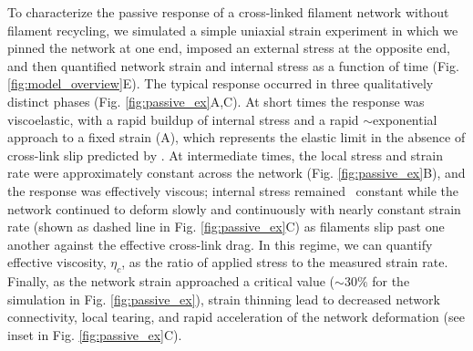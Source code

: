 To characterize the passive response of a cross-linked filament network without filament recycling, we simulated a simple uniaxial strain experiment in which we pinned the network at one end, imposed an external stress at the opposite end, and then quantified network strain and internal stress as a function of time (Fig. \ref{fig:model_overview}E). The typical response occurred in three qualitatively distinct phases (Fig. \ref{fig:passive_ex}A,C). At short times the response was viscoelastic, with a rapid buildup of internal stress and a rapid $\sim$exponential approach to a fixed strain (A), which represents the elastic limit in the absence of cross-link slip predicted by \cite{theo_hlm}. At intermediate times, the local stress and strain rate were approximately constant across the network (Fig. \ref{fig:passive_ex}B), and the response was effectively viscous; internal stress remained ~constant while the network continued to deform slowly and continuously with nearly constant strain rate (shown as dashed line in Fig. \ref{fig:passive_ex}C) as filaments slip past one another against the effective cross-link drag. In this regime, we can quantify effective viscosity, $\eta_c$,  as the ratio of applied stress to the measured strain rate. Finally, as the network strain approached a critical value ($\sim 30\%$ for the simulation in Fig. \ref{fig:passive_ex}), strain thinning lead to decreased network connectivity, local tearing, and rapid acceleration of the network deformation (see inset in Fig. \ref{fig:passive_ex}C).


